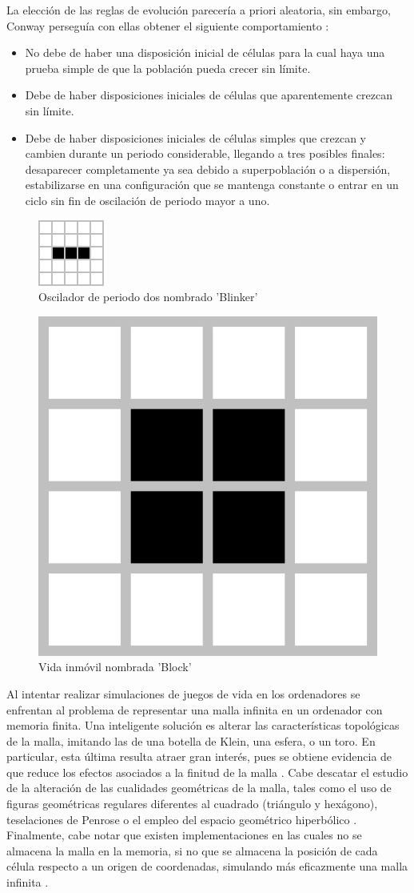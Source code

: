 \documentclass[../proyecto.tex]{book}
\begin{document}
La elección de las reglas de evolución parecería a priori aleatoria, sin embargo, Conway perseguía con ellas obtener el siguiente comportamiento \cite{libroGardner}:
\begin{itemize}
	\item No debe de haber una disposición inicial de células para la cual haya una prueba simple de que la población pueda crecer sin límite.
	\item Debe de haber disposiciones iniciales de células que aparentemente crezcan sin límite. 
	\item Debe de haber disposiciones iniciales de células simples que crezcan y cambien durante un periodo considerable, llegando a tres posibles finales: desaparecer completamente ya sea debido a superpoblación o a dispersión, estabilizarse en una configuración que se mantenga constante o entrar en un ciclo sin fin de oscilación de periodo mayor a uno.  
\end{itemize}

\begin{figure}[H]
	\centering
	\includegraphics[height=.15\linewidth]{./images/blinker.png}
	\caption{Oscilador de periodo dos nombrado 'Blinker'}
	\label{fig:blinker}
\end{figure} 
\begin{figure}[H]
	
	\centering
	\includegraphics[height=.15\linewidth]{./images/block.png}
	\caption{Vida inmóvil nombrada 'Block'}
	\label{fig:block}
\end{figure} 

Al intentar realizar simulaciones de juegos de vida en los ordenadores se enfrentan al problema de representar una malla infinita en un ordenador con memoria finita. Una inteligente solución es alterar las características topológicas de la malla, imitando las de una botella de Klein, una esfera, o un toro. En particular, esta última resulta atraer gran interés, pues se obtiene evidencia de que reduce los efectos asociados a la finitud de la malla \cite{finitudMalla, finitudMalla2}. Cabe descatar el estudio de la alteración de las cualidades geométricas de la malla, tales como el uso de figuras geométricas regulares diferentes al cuadrado (triángulo y hexágono)\cite{triangular}, teselaciones de Penrose \cite{penrose} o el empleo del espacio geométrico hiperbólico \cite{hiperbolico}. Finalmente, cabe notar que existen implementaciones en las cuales no se almacena la malla en la memoria, si no que se almacena la posición de cada célula respecto a un origen de coordenadas, simulando más eficazmente una malla infinita \cite{boardless}.
\end{document}
